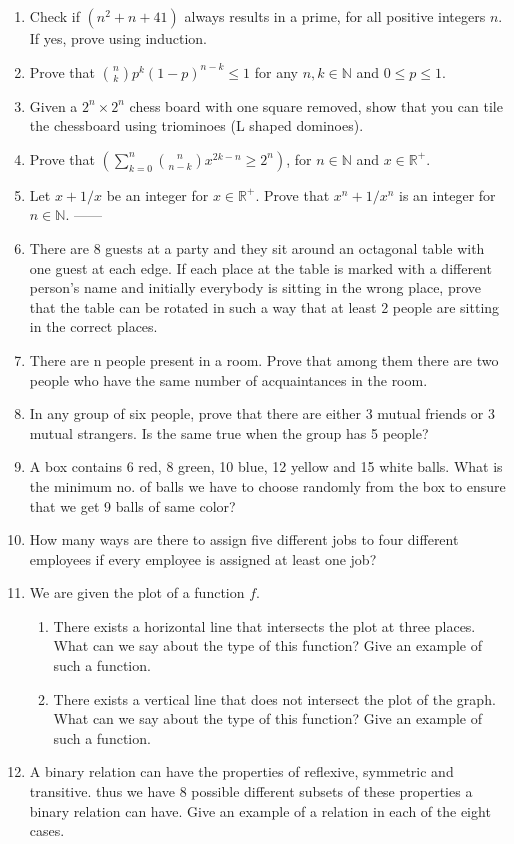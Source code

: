 \documentclass[a4paper]{article}
\begin{document}
\begin{enumerate}
\item Check if $(n^2 +n+41)$ always results in a prime, for all positive integers $n$. If yes, prove using induction.

\item Prove that ${n \choose k} {p^k}(1-p)^{n-k} \leq 1$ for any $n,k \in \mathbb{N}$ and $0 \leq p \leq 1$.

\item Given a $2^n \times 2^n$ chess board with one square removed, show that you can tile the chessboard using triominoes (L shaped dominoes). 

\item Prove that $\left( \sum_{k=0}^{n} {n \choose {n-k}} x^{2k-n} \geq 2^n \right)$, for $n \in \mathbb{N}$ and $x \in \mathbb{R}^+$.

\item Let $x+ 1/x$ be an integer for $x \in \mathbb{R}^+$. Prove that $x^n+ 1/x^n$ is an integer for $n \in \mathbb{N}$. 
------
\item There are 8 guests at a party and they sit around an octagonal table with one guest at each edge. If each place at the table is marked with a different person’s name and initially everybody is sitting in the wrong place, prove that the table can be rotated in such a way that at least 2 people are sitting in the correct places.

\item There are n people present in a room. Prove that among them there are two people who have the same number of acquaintances in the room.

\item In any group of six people, prove that there are either 3 mutual friends or 3 mutual strangers. Is the same true when the group has 5 people?

\item A box contains 6 red, 8 green, 10 blue, 12 yellow and 15 white balls. What is the minimum no. of balls we have to choose randomly from the box to ensure that we get 9 balls of same color?

\item How many ways are there to assign five different jobs to four different employees if every employee is assigned at least one job?

\item We are given the plot of a function $f$. 
\begin{enumerate}
\item There exists a horizontal line that intersects the plot at three places. What can we say about the type of this function? Give an example of such a function.
\item There exists a vertical line that does not intersect the plot of the graph. What can we say about the type of this function? Give an example of such a function.
\end{enumerate}
\item A binary relation can have the properties of reflexive, symmetric and transitive. thus we have 8 possible different subsets of these properties a binary relation can have. Give
an example of a relation in each of the eight cases.


\end{enumerate}
\end{document}
